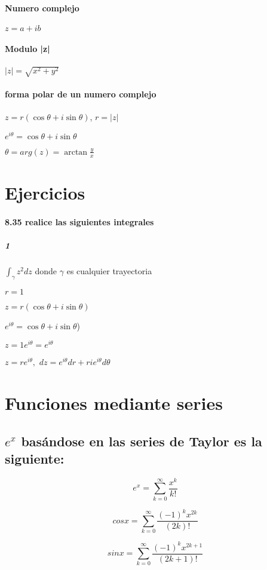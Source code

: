 \documentclass[10pt,a4paper]{book}
\begin{document}
	
	
	
\paragraph{Numero complejo}
$z=a+ib$
\paragraph{Modulo  |z|}
$|z|=\sqrt{x^2+y^2}$ 
\paragraph{forma polar de un numero complejo}
$z=r(\cos\theta+i \sin\theta )$,
$r=|z|$

$e^{i\theta}=\cos\theta+i \sin\theta$

$\theta= arg(z)= \arctan \frac{y}{x}$



\section{Ejercicios}

\paragraph{8.35 realice las siguientes integrales}
\subparagraph{1}
$\int_{\gamma} z^2 dz$ donde $\gamma$ es cualquier trayectoria


$r=1$

$z=r(\cos\theta+i \sin\theta )$

$e^{i\theta}=\cos\theta+i \sin\theta$)

$z=1 e^{i\theta}=e^{i\theta}$

$z=re^{i\theta},  $
$dz=e^{i\theta}dr+rie^{i\theta} d\theta$


\section{Funciones mediante series}

\subsection{ $e^x$ basándose en las series de Taylor es la siguiente: }


\[e^x=\sum_{k=0}^{\infty} \frac{x^k}{k!}  \]

\[cos x =\sum_{k=0}^{\infty} \frac{(-1)^k x^{2k}}{(2k)!}\]


\[sin x =\sum_{k=0}^{\infty} \frac{(-1)^k x^{2k+1}}{(2k+1)!}\]
\end{document}
